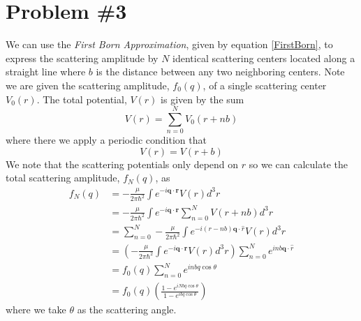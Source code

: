 \documentclass[11pt]{article}
\numberwithin{equation}{section}
\begin{document}
\pagebreak

\section{Problem \#3}
We can use the \emph{First Born Approximation}, given by equation \ref{FirstBorn}, to
express the scattering amplitude by $N$ identical scattering centers located along a 
straight line where $b$ is the distance between any two neighboring centers. Note we 
are given the scattering amplitude, $f_0(q)$, of a single scattering center $V_0(r)$.
The total potential, $V(r)$ is given by the sum 
$$V(r) = \sum_{n=0}^{N}V_0(r+nb)$$
where there we apply a periodic condition that
$$V(r) = V(r+b)$$
We note that the scattering potentials only depend on $r$ so we can calculate the total 
scattering amplitude, $f_N(q)$, as
\begin{align*}
f_N(q) &= -\frac{\mu}{2\pi\hbar^2}\int{e^{-i\mathbf{q}\cdot\mathbf{r}}}V(r)d^3r\\
&= -\frac{\mu}{2\pi\hbar^2}\int{e^{-i\mathbf{q}\cdot\mathbf{r}}}\sum_{n=0}^{N}V(r+nb)d^3r\\
&= \sum_{n=0}^{N}-\frac{\mu}{2\pi\hbar^2}\int{e^{-i(r-nb)\mathbf{q}\cdot\hat{r}}}V(r)d^3r\\
&= \left(-\frac{\mu}{2\pi\hbar^2}\int{e^{-i\mathbf{q}\cdot\mathbf{r}}}V(r)d^3r\right)\sum_{n=0}^Ne^{inb\mathbf{q}\cdot{\hat{r}}}\\
&= f_0(q)\sum_{n=0}^Ne^{inbq\cos\theta}\\
&= f_0(q)\left(\frac{1-e^{iNbq\cos\theta}}{1-e^{ibq\cos\theta}}\right)
\end{align*}
where we take $\theta$ as the scattering angle.
\end{document}
